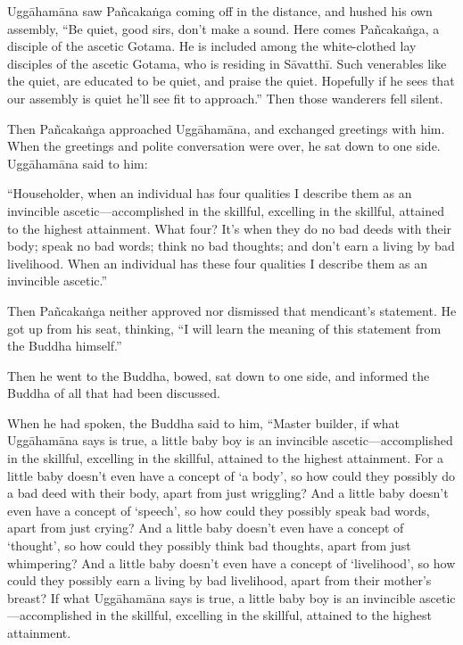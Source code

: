 \documentclass[12pt,openany]{book}%
\begin{document}
\textsanskrit{Uggāhamāna} saw \textsanskrit{Pañcakaṅga} coming off in the distance, and hushed his own assembly, “Be quiet, good sirs, don’t make a sound. Here comes \textsanskrit{Pañcakaṅga}, a disciple of the ascetic Gotama. He is included among the white-clothed lay disciples of the ascetic Gotama, who is residing in \textsanskrit{Sāvatthī}. Such venerables like the quiet, are educated to be quiet, and praise the quiet. Hopefully if he sees that our assembly is quiet he’ll see fit to approach.” Then those wanderers fell silent. 

Then \textsanskrit{Pañcakaṅga} approached \textsanskrit{Uggāhamāna}, and exchanged greetings with him. When the greetings and polite conversation were over, he sat down to one side. \textsanskrit{Uggāhamāna} said to him: 

“Householder, when an individual has four qualities I describe them as an invincible ascetic—accomplished in the skillful, excelling in the skillful, attained to the highest attainment. What four? It’s when they do no bad deeds with their body; speak no bad words; think no bad thoughts; and don’t earn a living by bad livelihood. When an individual has these four qualities I describe them as an invincible ascetic.” 

Then \textsanskrit{Pañcakaṅga} neither approved nor dismissed that mendicant’s statement. He got up from his seat, thinking, “I will learn the meaning of this statement from the Buddha himself.” 

Then he went to the Buddha, bowed, sat down to one side, and informed the Buddha of all that had been discussed. 

When he had spoken, the Buddha said to him, “Master builder, if what \textsanskrit{Uggāhamāna} says is true, a little baby boy is an invincible ascetic—accomplished in the skillful, excelling in the skillful, attained to the highest attainment. For a little baby doesn’t even have a concept of ‘a body’, so how could they possibly do a bad deed with their body, apart from just wriggling? And a little baby doesn’t even have a concept of ‘speech’, so how could they possibly speak bad words, apart from just crying? And a little baby doesn’t even have a concept of ‘thought’, so how could they possibly think bad thoughts, apart from just whimpering? And a little baby doesn’t even have a concept of ‘livelihood’, so how could they possibly earn a living by bad livelihood, apart from their mother’s breast? If what \textsanskrit{Uggāhamāna} says is true, a little baby boy is an invincible ascetic—accomplished in the skillful, excelling in the skillful, attained to the highest attainment. 
\end{document}
